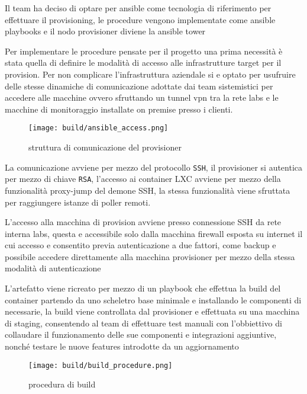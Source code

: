 Il team ha deciso di optare per ansible\cite{ansible} come tecnologia di riferimento per effettuare il provisioning, le procedure vengono implementate come ansible playbooks e il nodo provisioner diviene la ansible tower

Per implementare le procedure pensate per il progetto una prima necessità è stata quella di definire le modalità di accesso alle infrastrutture target per il provision. Per non complicare l'infrastruttura aziendale si e optato per usufruire delle stesse dinamiche di comunicazione adottate dai team sistemistici per accedere alle macchine ovvero sfruttando un tunnel vpn tra la rete labs e le macchine di monitoraggio installate on premise presso i clienti.

\begin{figure}[H]
    \centering
    \texttt{[image: build/ansible\_access.png]}
    \caption{struttura di comunicazione del provisioner}
    \label{fig:ansible_access}
\end{figure}

La comunicazione avviene per mezzo del protocollo \verb|SSH|, il provisioner si autentica per mezzo di chiave \verb|RSA|, l'accesso ai container LXC avviene per mezzo della funzionalità proxy-jump del demone SSH, la stessa funzionalità viene sfruttata per raggiungere istanze di poller remoti.

L'accesso alla macchina di provision avviene presso connessione SSH da rete interna labs, questa e accessibile solo dalla macchina firewall esposta su internet il cui accesso e consentito previa autenticazione a due fattori, come backup e possibile accedere direttamente alla macchina provisioner per mezzo della stessa modalità di autenticazione

L'artefatto viene ricreato per mezzo di un playbook che effettua la build del container partendo da uno scheletro base minimale e installando le componenti di necessarie, la build viene controllata dal provisioner e effettuata su una macchina di staging, consentendo al team di effettuare test manuali con l'obbiettivo di collaudare il funzionamento delle sue componenti e integrazioni aggiuntive, nonché testare le nuove features introdotte da un aggiornamento

\begin{figure}[H]
    \centering
    \texttt{[image: build/build\_procedure.png]}
    \caption{procedura di build}
    \label{fig:build_procedure}
\end{figure}

